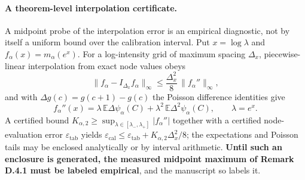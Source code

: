\paragraph{A theorem-level interpolation certificate.} A midpoint probe of the interpolation error is an empirical diagnostic, not by itself a uniform bound over the calibration interval. Put $x=\log\lambda$ and $f_\alpha(x)=m_\alpha(e^x)$. For a log-intensity grid of maximum spacing $\Delta_x$, piecewise-linear interpolation from exact node values obeys
\begin{equation}
\|f_\alpha-I_{\Delta_x}f_\alpha\|_\infty
\le\frac{\Delta_x^2}{8}\,\|f_\alpha''\|_\infty ,
\tag{D.8c}
\end{equation}
and with $\Delta g(c)=g(c{+}1)-g(c)$ the Poisson difference identities give
\[
f_\alpha''(x)=\lambda\,\mathbb E\Delta\psi_\alpha(C)+\lambda^2\,\mathbb E\Delta^2\psi_\alpha(C),
\qquad\lambda=e^x .
\]
A certified bound $K_{\alpha,2}\ge\sup_{\lambda\in[\lambda_-,\lambda_+]}|f_\alpha''|$ together with a certified node-evaluation error $\varepsilon_{\mathrm{tab}}$ yields $\varepsilon_{\mathrm{cal}}\le\varepsilon_{\mathrm{tab}}+K_{\alpha,2}\Delta_x^2/8$; the expectations and Poisson tails may be enclosed analytically or by interval arithmetic. \textbf{Until such an enclosure is generated, the measured midpoint maximum of Remark D.4.1 must be labeled empirical}, and the manuscript so labels it.

